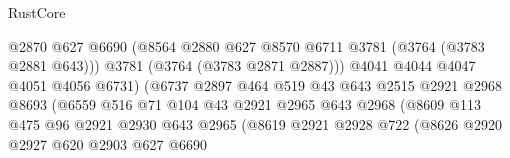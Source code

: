 \begin{lexlean}{RustCore}
\begin{coremodule}
                                        @2870
                                        @627
                                        @6690
                                        (@8564
                                          @2880
                                          @627
                                          @8570
                                          @6711
                                          @3781
                                          (@3764 (@3783 @2881 @643)))
                                        @3781
                                        (@3764 (@3783 @2871 @2887)))
                                      @4041
                                      @4044
                                      @4047
                                      @4051
                                      @4056
                                      @6731)
                                    (@6737
                                      @2897
                                      @464
                                      @519
                                      @43
                                      @643
                                      @2515
                                      @2921
                                      @2968
                                      @8693
                                      (@6559
                                        @516
                                        @71
                                        @104
                                        @43
                                        @2921
                                        @2965
                                        @643
                                        @2968
                                        (@8609
                                          @113
                                          @475
                                          @96
                                          @2921
                                          @2930
                                          @643
                                          @2965
                                          (@8619
                                            @2921
                                            @2928
                                            @722
                                            (@8626
                                              @2920
                                              @2927
                                              @620
                                              @2903
                                              @627
                                              @6690

\end{coremodule}
\end{lexlean}
